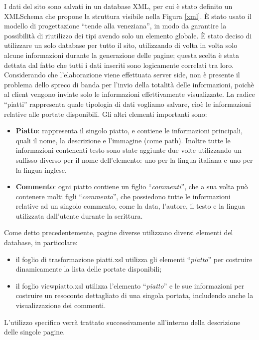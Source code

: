 \documentclass[10pt,a4paper,onecolumn]{article}
\begin{document}
I dati del sito sono salvati in un database XML, per cui è stato definito un XMLSchema che propone la struttura visibile nella Figura \ref{xml}. È stato usato il modello di progettazione ``tende alla veneziana'', in modo da garantire la possibilità di riutilizzo dei tipi avendo solo un elemento globale. 
È stato deciso di utilizzare un solo database per tutto il sito, utilizzando di volta in volta solo alcune informazioni durante la generazione delle pagine; questa scelta è stata dettata dal fatto che tutti i dati inseriti sono logicamente correlati tra loro.
Considerando che l'elaborazione viene effettuata server side, non è presente il problema dello spreco di banda per l'invio della totalità delle informazioni, poichè al client vengono inviate solo le informazioni effettivamente visualizzate.
La radice ``piatti'' rappresenta quale tipologia di dati vogliamo salvare, cioè le informazioni relative alle portate disponibili.
Gli altri elementi importanti sono:
\begin{itemize}
 \item \textbf{Piatto}: rappresenta il singolo piatto, e contiene le informazioni principali, quali il nome, la descrizione e l'immagine (come path). Inoltre tutte le informazioni contenenti testo sono state aggiunte due volte utilizzando un suffisso diverso per il nome dell'elemento: uno per la lingua italiana e uno per la lingua inglese.
 \item \textbf{Commento}: ogni piatto contiene un figlio ``\textit{commenti}'', che a sua volta può contenere molti figli ``\textit{commento}'', che possiedono tutte le informazioni relative ad un singolo commento, come la data, l'autore, il testo e la lingua utilizzata dall'utente durante la scrittura.
\end{itemize}
Come detto precedentemente, pagine diverse utilizzano diversi elementi del database, in particolare:
\begin{itemize}
 \item il foglio di trasformazione piatti.xsl utilizza gli elementi ``\textit{piatto}'' per costruire dinamicamente la lista delle portate disponibili;
 \item il foglio viewpiatto.xsl utilizza l'elemento ``\textit{piatto}'' e le sue informazioni per costruire un resoconto dettagliato di una singola portata, includendo anche la visualizzazione dei commenti.
\end{itemize}
L'utilizzo specifico verrà trattato successivamente all'interno della descrizione delle singole pagine.
\end{document}

